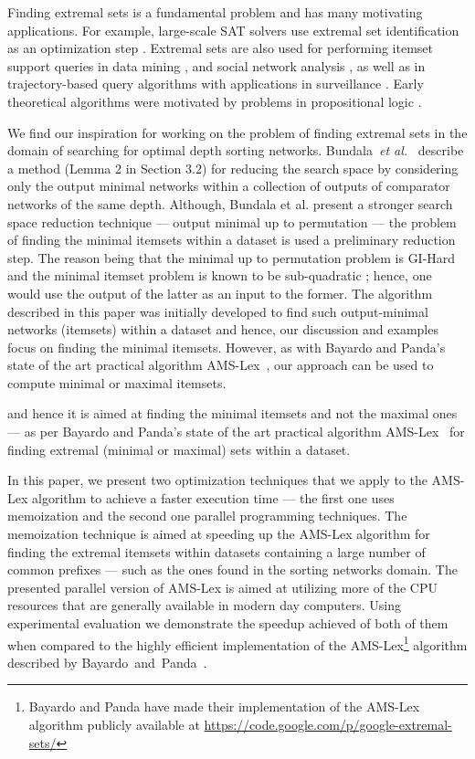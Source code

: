 \documentclass[13pt,a4paper]{article}
\begin{document}
Finding extremal sets is a fundamental problem and has many motivating applications. For example, large-scale SAT solvers use extremal set identification as an optimization step \cite{EenBiere05}. Extremal sets are also used for performing itemset support queries in data mining \cite{Mielikainen+06}, and social network analysis \cite{BayardoPanda11}, as well as in trajectory-based query algorithms with applications in surveillance \cite{Vieira+09}. Early theoretical algorithms were motivated by problems in propositional logic \cite{Pritchard91}.

We find our inspiration for working on the problem of finding extremal sets in the domain of searching for optimal depth sorting networks. Bundala~\textit{et al.}~\cite{BundalaCCSZ14_Optimal_Depth} describe a method (Lemma 2 in Section 3.2) for reducing the search space by considering only the output minimal networks within a collection of outputs of comparator networks of the same depth. Although, Bundala et al. present a stronger search space reduction technique --- output minimal up to permutation --- the problem of finding the minimal itemsets within a dataset is used a preliminary reduction step. The reason being that the minimal up to permutation problem is GI-Hard \cite{Marinov:II:GI-Hard} and the minimal itemset problem is known to be sub-quadratic \cite{Pritchard97}; hence, one would use the output of the latter as an input to the former. The algorithm described in this paper was initially developed to find such output-minimal networks (itemsets) within a dataset and hence, our discussion and examples focus on finding the minimal itemsets. However, as with Bayardo and Panda's state of the art practical algorithm AMS-Lex~\cite{BayardoPanda11}, our approach can be used to compute minimal or maximal itemsets.

and hence it is aimed at finding the minimal itemsets and not the maximal ones --- as per Bayardo and Panda's state of the art practical algorithm AMS-Lex~\cite{BayardoPanda11} for finding extremal (minimal or maximal) sets within a dataset.



In this paper, we present two optimization techniques that we apply to the AMS-Lex algorithm to achieve a faster execution time --- the first one uses memoization and the second one parallel programming techniques. The memoization technique is aimed at speeding up the AMS-Lex algorithm for finding the extremal itemsets within datasets containing a large number of common prefixes --- such as the ones found in the sorting networks domain. The presented parallel version of AMS-Lex is aimed at utilizing more of the CPU resources that are generally available in modern day computers. Using experimental evaluation we demonstrate the speedup achieved of both of them when compared to the highly efficient implementation of the AMS-Lex\footnote{Bayardo and Panda have made their implementation of the AMS-Lex algorithm publicly available at \url{https://code.google.com/p/google-extremal-sets/}} algorithm described by Bayardo~and~Panda~\cite{BayardoPanda11}. 
\end{document}

